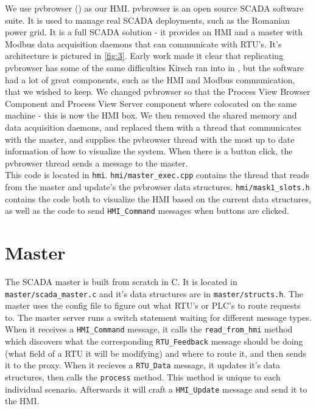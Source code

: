 \documentclass[11pt,a4paper,oldfontcommands]{memoir}
\def\code#1{\texttt{#1}}
\begin{document}
\indent \indent
We use pvbrowser (\cite{pvbrowser}) as our HMI. pvbrowser is an open source SCADA 
software suite. It is used to manage real SCADA deployments, such as the Romanian power
grid. It is a full SCADA solution - it provides an HMI and a master with Modbus
data acquisition daemons that can communicate with RTU's. It's architecture is pictured
in \ref{fig:3}. Early work made it clear that replicating pvbrowser has some of the
same difficulties Kirsch ran into in \cite{Survivable SCADA Via Intrusion-Tolerant Replication}
, but the software had a lot of great components, such as the HMI  and Modbus
communication, that we wished to keep. We changed pvbrowser so that the
Process View Browser Component and Process View Server component where colocated on
the same machine - this is now the HMI box. We then removed the shared memory and
data acquisition daemons, and replaced them with a thread that communicates with the
master, and supplies the pvbrowser thread with the most up to date information of
how to visualize the system. When there is a button click, the pvbrowser thread
sends a message to the master. \\

\indent 
This code is located in \code{hmi}. \code{hmi/master\_exec.cpp} contains the thread
that reads from the master and update's the pvbrowser data structures.
\code{hmi/mask1\_slots.h} contains the code both to visualize the HMI based on the
current data structures, as well as the code to send \code{HMI\_Command} messages
when buttons are clicked. \\

\section{Master}

\indent \indent
The SCADA master is built from scratch in C. It is located in \code{master/scada\_master.c}
and it's data structures are in \code{master/structs.h}. The master uses the config file
to figure out what RTU's or PLC's to route requests to. The master server runs a switch
statement waiting for different message types. When it receives a \code{HMI\_Command}
message, it calls the \code{read\_from\_hmi} method which discovers what the corresponding
\code{RTU\_Feedback} message
should be doing (what field of a RTU it will be modifying) and where to route it,
and then sends it to the proxy. When it recieves a \code{RTU\_Data} message, it updates
it's data structures, then calls the \code{process} method. This method is unique
to each individual scenario. Afterwards it will craft a \code{HMI\_Update} message
and send it to the HMI. \\
\end{document}
